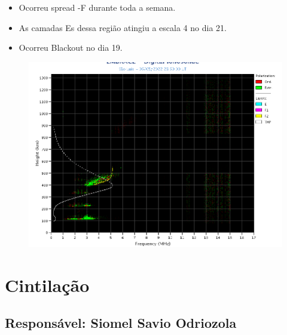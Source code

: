 \documentclass[a4paper, 10pt]{article}
\begin{document}
 \begin{itemize}
\item Ocorreu spread -F durante toda a semana. 
\item As camadas Es dessa região atingiu a escala 4 no dia 21. 
\item Ocorreu Blackout no dia 19.
\end{itemize}
\begin{figure}[H]
    
                        \centering
   
                             \includegraphics[width=14cm]{./figures//SãoLuís.png}

                        \end{figure}

                     
\section{Cintilação} 
 \subsection{Responsável: Siomel Savio Odriozola} 
 
\end{document}
